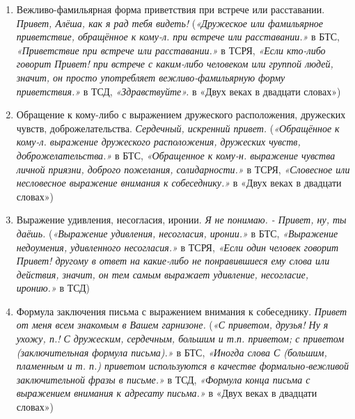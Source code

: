 \begin{enumerate}
    \item Вежливо-фамильярная форма приветствия при встрече или расставании. \textit{Привет, Алёша, как я рад тебя видеть!}
(\textit{«Дружеское или фамильярное приветствие, обращённое к кому-л. при встрече или расставании.»} в БТС,
\textit{«Приветствие при встрече или расставании.»} в ТСРЯ,
\textit{«Если кто-либо говорит Привет! при встрече с каким-либо человеком или группой людей,
значит, он просто употребляет вежливо-фамильярную форму приветствия.»} в ТСД,
\textit{«Здравствуйте».} в «Двух веках в двадцати словах»)

    \item Обращение к кому-либо с выражением дружеского расположения, дружеских чувств, доброжелательства. \textit{Сердечный, искренний привет.}
(\textit{«Обращённое к кому-л. выражение дружеского расположения, дружеских чувств, доброжелательства.»} в БТС,
\textit{«Обращенное к кому-н. выражение чувства личной приязни, доброго пожелания, солидарности.»} в ТСРЯ,
\textit{«Словесное или несловесное выражение внимания к собеседнику.»} в «Двух веках в двадцати словах»)

    \item Выражение удивления, несогласия, иронии. \textit{Я не понимаю. - Привет, ну, ты даёшь.}
(\textit{«Выражение удивления, несогласия, иронии.»} в БТС,
\textit{«Выражение недоумения, удивленного несогласия.»} в ТСРЯ,
\textit{«Если один человек говорит Привет! другому в ответ на какие-либо
не понравившиеся ему слова или действия, значит, он тем самым выражает удивление, несогласие, иронию.»} в ТСД)

    \item Формула заключения письма с выражением внимания к собеседнику. \textit{Привет от меня всем знакомым в Вашем гарнизоне.}
(\textit{«С приветом, друзья! Ну я ухожу, п.! С дружеским, сердечным, большим и т.п. приветом;
с приветом (заключительная формула письма).»} в БТС,
\textit{«Иногда слова С (большим, пламенным и т. п.) приветом используются в качестве
формально-вежливой заключительной фразы в письме.»} в ТСД,
\textit{«Формула конца письма с выражением внимания к адресату письма.»} в «Двух веках в двадцати словах»)



\end{enumerate}
